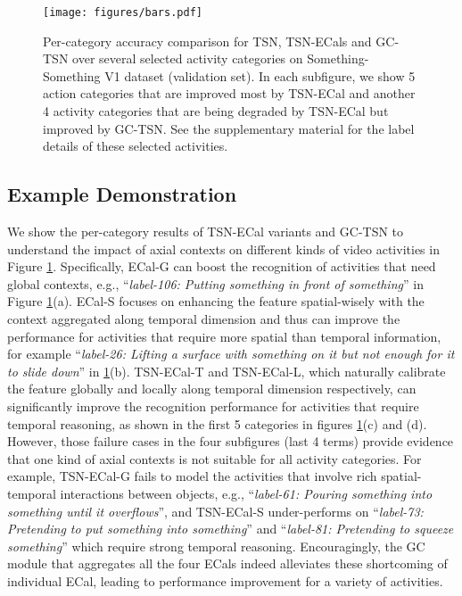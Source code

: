 \begin{figure}[]
\centering
\texttt{[image: figures/bars.pdf]}
\vspace{-0.4cm}
\caption{Per-category accuracy comparison for TSN, TSN-ECals and GC-TSN over several selected activity categories on Something-Something V1 dataset (validation set). In each subfigure, we show 5 action categories that are improved most by TSN-ECal and another 4 activity categories that are being degraded by TSN-ECal but improved by GC-TSN. See the supplementary material for the label details of these selected activities.}
\label{figure:bars}
\vspace{-0.6cm}
\end{figure}

\subsection{Example Demonstration}
\vspace{-0.1cm}
We show the per-category results of TSN-ECal variants and GC-TSN to understand the impact of axial contexts on different kinds of video activities in Figure \ref{figure:bars}. Specifically, ECal-G can boost the recognition of activities that need global contexts, e.g., ``\textit{label-106: Putting something in front of something}'' in Figure \ref{figure:bars}(a). ECal-S focuses on enhancing the feature spatial-wisely with the context aggregated along temporal dimension and thus can improve the performance for activities that require more spatial than temporal information, for example ``\textit{label-26: Lifting a surface with something on it but not enough for it to slide down}'' in \ref{figure:bars}(b). TSN-ECal-T and TSN-ECal-L, which naturally calibrate the feature globally and locally along temporal dimension respectively, can significantly improve the recognition performance for activities that require temporal reasoning, as shown in the first 5 categories in figures \ref{figure:bars}(c) and (d). However, those failure cases in the four subfigures (last 4 terms) provide evidence that one kind of axial contexts is not suitable for all activity categories. For example, TSN-ECal-G fails to model the activities that involve rich spatial-temporal interactions between objects, e.g., ``\textit{label-61: Pouring something into something until it overflows}'', and TSN-ECal-S under-performs on ``\textit{label-73: Pretending to put something into something}'' and ``\textit{label-81: Pretending to squeeze something}'' which require strong temporal reasoning. Encouragingly, the GC module that aggregates all the four ECals indeed alleviates these shortcoming of individual ECal, leading to  performance improvement for a variety of activities. 


